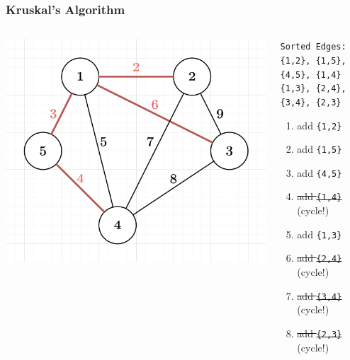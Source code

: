 \documentclass[aspectratio=169]{beamer}
\begin{document}
    \begin{frame}
        \frametitle{Kruskal's Algorithm}
        \begin{columns}
            \begin{column}{0.5 \textwidth}
                \begin{center}
                    \includegraphics[scale=0.4]{images/mst_example.png}
                \end{center}
            \end{column}
            \begin{column}{0.5 \textwidth}
                \texttt{Sorted Edges:} \\
                \texttt{\{1,2\}, \{1,5\}, \{4,5\}, \{1,4\}} \\ 
                \texttt{\{1,3\}, \{2,4\}, \{3,4\}, \{2,3\}}
                \begin{enumerate}
                    \item add \texttt{\{1,2\}}
                    \item add \texttt{\{1,5\}}
                    \item add \texttt{\{4,5\}}
                    \item \sout{add \texttt{\{1,4\}}} (cycle!)
                    \item add \texttt{\{1,3\}}
                    \item \sout{add \texttt{\{2,4\}}} (cycle!)
                    \item \sout{add \texttt{\{3,4\}}} (cycle!)
                    \item \sout{add \texttt{\{2,3\}}} (cycle!)
                \end{enumerate}
            \end{column}
        \end{columns}
    \end{frame}
    
\end{document}
